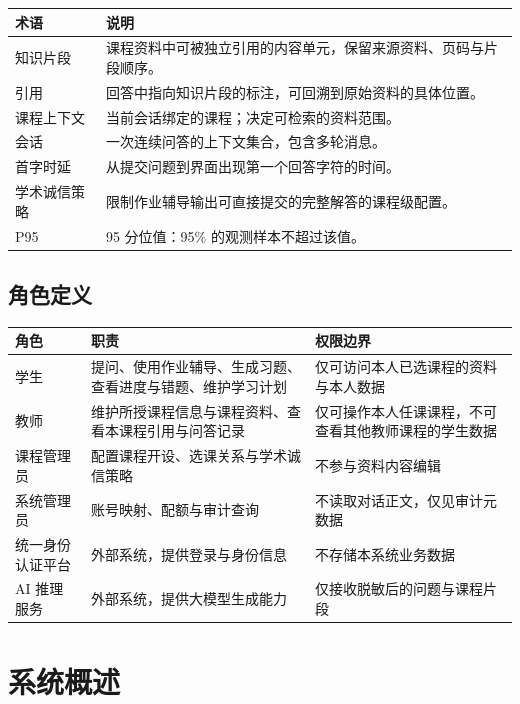 \documentclass[12pt,a4paper]{ctexart}
\begin{document}
\begin{longtable}{@{}L{3.4cm}L{11.8cm}@{}}
  \toprule
  \textbf{术语} & \textbf{说明} \\
  \midrule
  \endhead
  知识片段 & 课程资料中可被独立引用的内容单元，保留来源资料、页码与片段顺序。 \\
  引用 & 回答中指向知识片段的标注，可回溯到原始资料的具体位置。 \\
  课程上下文 & 当前会话绑定的课程；决定可检索的资料范围。 \\
  会话 & 一次连续问答的上下文集合，包含多轮消息。 \\
  首字时延 & 从提交问题到界面出现第一个回答字符的时间。 \\
  学术诚信策略 & 限制作业辅导输出可直接提交的完整解答的课程级配置。 \\
  P95 & 95 分位值：95\% 的观测样本不超过该值。 \\
  \bottomrule
\end{longtable}

\subsection{角色定义}

\begin{longtable}{@{}L{2.6cm}L{6.0cm}L{6.4cm}@{}}
  \toprule
  \textbf{角色} & \textbf{职责} & \textbf{权限边界} \\
  \midrule
  \endhead
  学生 & 提问、使用作业辅导、生成习题、查看进度与错题、维护学习计划 & 仅可访问本人已选课程的资料与本人数据 \\
  教师 & 维护所授课程信息与课程资料、查看本课程引用与问答记录 & 仅可操作本人任课课程，不可查看其他教师课程的学生数据 \\
  课程管理员 & 配置课程开设、选课关系与学术诚信策略 & 不参与资料内容编辑 \\
  系统管理员 & 账号映射、配额与审计查询 & 不读取对话正文，仅见审计元数据 \\
  统一身份认证平台 & 外部系统，提供登录与身份信息 & 不存储本系统业务数据 \\
  AI 推理服务 & 外部系统，提供大模型生成能力 & 仅接收脱敏后的问题与课程片段 \\
  \bottomrule
\end{longtable}

\section{系统概述}
\end{document}
